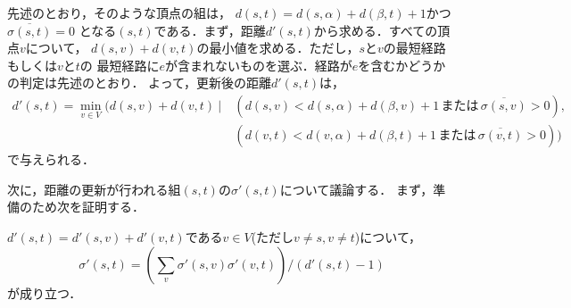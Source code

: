 先述のとおり，そのような頂点の組は，
$d(s,t)=d(s,\alpha)+d(\beta,t)+1$かつ$\overline{\sigma(s,t)}=0$
となる$(s,t)$である．まず，距離$d'(s,t)$から求める．すべての頂点$v$について，
$d(s,v)+d(v,t)$の最小値を求める．ただし，$s$と$v$の最短経路もしくは$v$と$t$の
最短経路に$e$が含まれないものを選ぶ．経路が$e$を含むかどうかの判定は先述のとおり．
よって，更新後の距離$d'(s,t)$は，
\begin{align*}
  d'(s,t) = \min_{v\in V}(d(s,v)+d(v,t)\:|\:
  &(d(s,v)<d(s,\alpha)+d(\beta,v)+1\,または\,\overline{\sigma(s,v)}>0),\\
  &(d(v,t)<d(v,\alpha)+d(\beta,t)+1\,または\,\overline{\sigma(v,t)}>0))
\end{align*}
で与えられる．

次に，距離の更新が行われる組$(s,t)$の$\sigma'(s,t)$について議論する．
まず，準備のため次を証明する．
\begin{theorem}
  $d'(s,t)=d'(s,v)+d'(v,t)$である$v\in V$(ただし$v\neq s,v\neq t$)について，
  \begin{equation}
    \label{eq:number-of-paths}
    \sigma'(s,t)=\left(
    \sum_{v}\sigma'(s,v)\sigma'(v,t)\right) / (d'(s,t)-1)
  \end{equation}
  が成り立つ．
\end{theorem}
